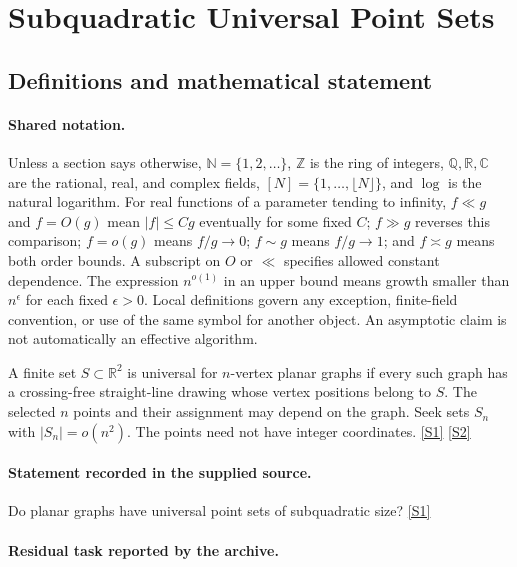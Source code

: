 \documentclass[11pt,a4paper]{article}
\newcommand{\N}{\mathbb{N}}
\newcommand{\Z}{\mathbb{Z}}
\newcommand{\Q}{\mathbb{Q}}
\newcommand{\R}{\mathbb{R}}
\newcommand{\C}{\mathbb{C}}
\newcommand{\sref}[2]{\hyperlink{source:#1:#2}{[S#2]}}
\begin{document}
\section{Subquadratic Universal Point Sets}\label{statement}


\subsection{Definitions and mathematical statement}

\paragraph{Shared notation.}Unless a section says otherwise, $\N=\{1,2,\ldots\}$,
$\Z$ is the ring of integers, $\Q,\R,\C$ are the rational, real, and complex
fields, $[N]=\{1,\ldots,\lfloor N\rfloor\}$, and $\log$ is the natural
logarithm. For real functions of a parameter tending to infinity,
$f\ll g$ and $f=O(g)$ mean $|f|\leq Cg$ eventually for some fixed $C$;
$f\gg g$ reverses this comparison; $f=o(g)$ means $f/g\to0$;
$f\sim g$ means $f/g\to1$; and $f\asymp g$ means both order bounds.
A subscript on $O$ or $\ll$ specifies allowed constant dependence.
The expression $n^{o(1)}$ in an upper bound means growth smaller than
$n^\epsilon$ for each fixed $\epsilon>0$. Local definitions govern any
exception, finite-field convention, or use of the same symbol for another
object. An asymptotic claim is not automatically an effective algorithm.



A finite set $S\subset\R^2$ is universal for $n$-vertex planar graphs if every such graph has a crossing-free straight-line drawing whose vertex positions belong to $S$. The selected $n$ points and their assignment may depend on the graph. Seek sets $S_n$ with $|S_n|=o(n^2)$. The points need not have integer coordinates. \sref{statement}{1} \sref{statement}{2}

\paragraph{Statement recorded in the supplied source.}
Do planar graphs have universal point sets of subquadratic size? \sref{statement}{1}

\paragraph{Residual task reported by the archive.}
\end{document}
